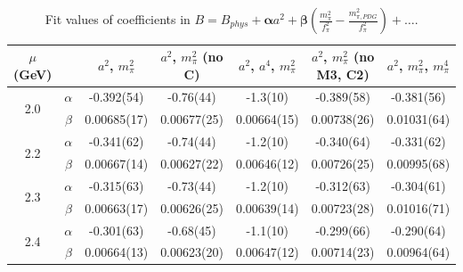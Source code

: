 \documentclass[12pt]{extarticle}
\begin{document}
\begin{table}[h!]
\begin{center}
\begin{tabular}{|c c|c|c|c|c|c|}
\hline
$\mu$ (GeV) &  & $a^2$, $m_\pi^2$& $a^2$, $m_\pi^2$ (no C)& $a^2$, $a^4$, $m_\pi^2$& $a^2$, $m_\pi^2$ (no M3, C2)& $a^2$, $m_\pi^2$, $m_\pi^4$\\
\hline
\multirow{2}{0.5in}{2.0} & $\alpha$ & -0.392(54)& -0.76(44)& -1.3(10)& -0.389(58)& -0.381(56)\\
 & $\beta$ & 0.00685(17)& 0.00677(25)& 0.00664(15)& 0.00738(26)& 0.01031(64)\\
\hline
\multirow{2}{0.5in}{2.2} & $\alpha$ & -0.341(62)& -0.74(44)& -1.2(10)& -0.340(64)& -0.331(62)\\
 & $\beta$ & 0.00667(14)& 0.00627(22)& 0.00646(12)& 0.00726(25)& 0.00995(68)\\
\hline
\multirow{2}{0.5in}{2.3} & $\alpha$ & -0.315(63)& -0.73(44)& -1.2(10)& -0.312(63)& -0.304(61)\\
 & $\beta$ & 0.00663(17)& 0.00626(25)& 0.00639(14)& 0.00723(28)& 0.01016(71)\\
\hline
\multirow{2}{0.5in}{2.4} & $\alpha$ & -0.301(63)& -0.68(45)& -1.1(10)& -0.299(66)& -0.290(64)\\
 & $\beta$ & 0.00664(13)& 0.00623(20)& 0.00647(12)& 0.00714(23)& 0.00964(64)\\
\hline
\end{tabular}
\caption{Fit values of coefficients in $B = B_{phys} + \mathbf{\alpha} a^2 + \mathbf{\beta}\left(\frac{m_\pi^2}{f_\pi^2}-\frac{m_{\pi,PDG}^2}{f_\pi^2}\right) + \ldots$.}
\end{center}
\end{table}




















\clearpage
\end{document}
